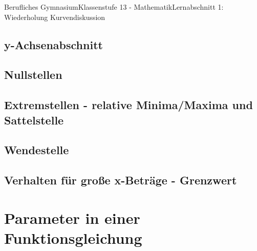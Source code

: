 \documentclass[11pt,twocolumn,oneside,openany,headings=optiontotoc,11pt,numbers=noenddot]{article}
\begin{document}
\begin{worksheet}{Berufliches Gymnasium}{Klassenstufe 13 - Mathematik}{Lernabschnitt 1: Wiederholung Kurvendiskussion}
		\subsection{y-Achsenabschnitt}
		\subsection{Nullstellen}
		\subsection{Extremstellen - relative Minima/Maxima und Sattelstelle}
		\subsection{Wendestelle}
		\subsection{Verhalten für große x-Beträge - Grenzwert}
		\section{Parameter in einer Funktionsgleichung}
	\end{worksheet}
\end{document}
